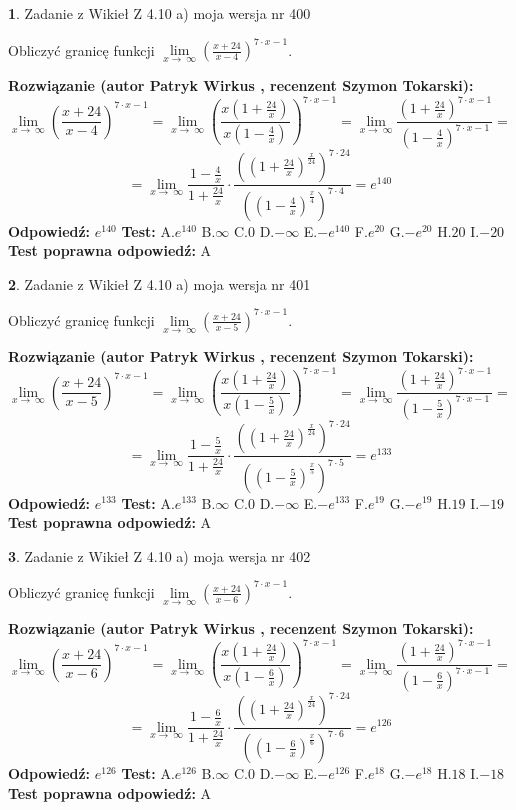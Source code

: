 \documentclass[12pt, a4paper]{article}
\theoremstyle{definition} %
\newtheorem{zad}{}
\newcommand{\zadStart}[1]{\begin{zad}#1\newline}
\newcommand{\zadStop}{\end{zad}}
\newcommand{\rozwStart}[2]{\noindent \textbf{Rozwiązanie (autor #1 , recenzent #2): }\newline}
\newcommand{\rozwStop}{\newline}
\newcommand{\odpStart}{\noindent \textbf{Odpowiedź:}\newline}
\newcommand{\odpStop}{\newline}
\newcommand{\testStart}{\noindent \textbf{Test:}\newline}
\newcommand{\testStop}{\newline}
\newcommand{\kluczStart}{\noindent \textbf{Test poprawna odpowiedź:}\newline}
\newcommand{\kluczStop}{\newline}
\begin{document}
\zadStart{Zadanie z Wikieł Z 4.10 a) moja wersja nr 400}

Obliczyć granicę funkcji  $\lim\limits_{x\to\ \infty}(\frac{x+24}{x-4})^{7\cdot x-1}$.
\zadStop
\rozwStart{Patryk Wirkus}{Szymon Tokarski}
$$\lim\limits_{x\to\ \infty}(\frac{x+24}{x-4})^{7\cdot x-1} = \lim\limits_{x\to\ \infty}(\frac{x(1+\frac{24}{x})}{x(1-\frac{4}{x})})^{7\cdot x-1}=\lim\limits_{x\to\ \infty}\frac{(1+\frac{24}{x})^{7\cdot x-1}}{(1-\frac{4}{x})^{7\cdot x-1}}=$$
$$=\lim\limits_{x\to\ \infty}\frac{1-\frac{4}{x}}{1+\frac{24}{x}}\cdot\frac{((1+\frac{24}{x})^{\frac{x}{24}})^{7\cdot24}}{((1-\frac{4}{x})^{\frac{x}{4}})^{7\cdot4}}=e^{140}$$
\rozwStop
\odpStart
$e^{140}$
\odpStop
\testStart
A.$e^{140}$ B.$\infty$ C.$0$ D.$-\infty$ E.$-e^{140}$
F.$e^{20}$ G.$-e^{20}$
H.$20$
I.$-20$
\testStop
\kluczStart
A
\kluczStop



\zadStart{Zadanie z Wikieł Z 4.10 a) moja wersja nr 401}

Obliczyć granicę funkcji  $\lim\limits_{x\to\ \infty}(\frac{x+24}{x-5})^{7\cdot x-1}$.
\zadStop
\rozwStart{Patryk Wirkus}{Szymon Tokarski}
$$\lim\limits_{x\to\ \infty}(\frac{x+24}{x-5})^{7\cdot x-1} = \lim\limits_{x\to\ \infty}(\frac{x(1+\frac{24}{x})}{x(1-\frac{5}{x})})^{7\cdot x-1}=\lim\limits_{x\to\ \infty}\frac{(1+\frac{24}{x})^{7\cdot x-1}}{(1-\frac{5}{x})^{7\cdot x-1}}=$$
$$=\lim\limits_{x\to\ \infty}\frac{1-\frac{5}{x}}{1+\frac{24}{x}}\cdot\frac{((1+\frac{24}{x})^{\frac{x}{24}})^{7\cdot24}}{((1-\frac{5}{x})^{\frac{x}{5}})^{7\cdot5}}=e^{133}$$
\rozwStop
\odpStart
$e^{133}$
\odpStop
\testStart
A.$e^{133}$ B.$\infty$ C.$0$ D.$-\infty$ E.$-e^{133}$
F.$e^{19}$ G.$-e^{19}$
H.$19$
I.$-19$
\testStop
\kluczStart
A
\kluczStop



\zadStart{Zadanie z Wikieł Z 4.10 a) moja wersja nr 402}

Obliczyć granicę funkcji  $\lim\limits_{x\to\ \infty}(\frac{x+24}{x-6})^{7\cdot x-1}$.
\zadStop
\rozwStart{Patryk Wirkus}{Szymon Tokarski}
$$\lim\limits_{x\to\ \infty}(\frac{x+24}{x-6})^{7\cdot x-1} = \lim\limits_{x\to\ \infty}(\frac{x(1+\frac{24}{x})}{x(1-\frac{6}{x})})^{7\cdot x-1}=\lim\limits_{x\to\ \infty}\frac{(1+\frac{24}{x})^{7\cdot x-1}}{(1-\frac{6}{x})^{7\cdot x-1}}=$$
$$=\lim\limits_{x\to\ \infty}\frac{1-\frac{6}{x}}{1+\frac{24}{x}}\cdot\frac{((1+\frac{24}{x})^{\frac{x}{24}})^{7\cdot24}}{((1-\frac{6}{x})^{\frac{x}{6}})^{7\cdot6}}=e^{126}$$
\rozwStop
\odpStart
$e^{126}$
\odpStop
\testStart
A.$e^{126}$ B.$\infty$ C.$0$ D.$-\infty$ E.$-e^{126}$
F.$e^{18}$ G.$-e^{18}$
H.$18$
I.$-18$
\testStop
\kluczStart
A
\kluczStop
\end{document}
